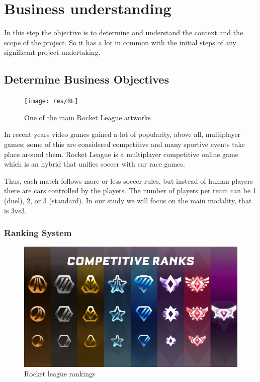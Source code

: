 \section{Business understanding} \label{seq:business}

 In this step the objective is to determine and understand the context and the scope of the project. So it has a lot in common with the initial steps of any significant project undertaking.

 \subsection{Determine Business Objectives}


\begin{figure}[h]
    \texttt{[image: res/RL]}
    \caption{One of the main Rocket League artworks}
\end{figure}

In recent years video games gained a lot of popularity, above all, multiplayer games; some of this are considered competitive and many sportive events take place around them.
Rocket League is a multiplayer competitive online game which is an hybrid that unifies soccer with car race games.

Thus, each match follows more or less soccer rules, but instead of human players there are cars controlled by the players. The number of players per team can be 1 (duel), 2, or 3 (standard). In our study we will focus on the main modality, that is 3vs3.

\subsubsection{Ranking System}

\begin{figure}[h]
    \includegraphics[width=\linewidth]{res/rankings}
    \caption{Rocket league rankings}
    \label{fig:ranks}
\end{figure}


